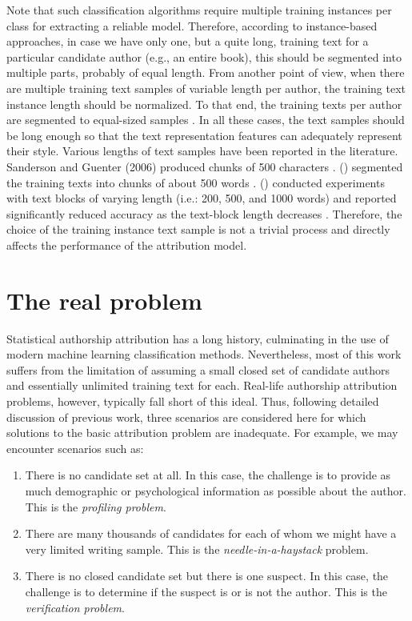 Note that such classification algorithms require multiple training instances per class for extracting a reliable model. Therefore, according to instance-based approaches, in case
we have only one, but a quite long, training text for a particular candidate author (e.g., an entire book), this should be segmented into multiple parts, probably of equal length.
From another point of view, when there are multiple training text samples of variable length per author, the training text instance length should be normalized. To that end, the training texts per author are segmented to equal-sized samples \cite{sanderson2006short}. In all these cases, the text samples should be long enough so that the text representation features can adequately represent their style. Various lengths of text samples have been reported in the literature. Sanderson and Guenter (2006) produced chunks of 500 characters \cite{sanderson2006short}. \citeauthor{koppel2006authorship} (\citeyear{koppel2006authorship}) segmented the training texts into
chunks of about 500 words \cite{koppel2006authorship}. \citeauthor{hirst2007bigrams} (\citeyear{hirst2007bigrams}) conducted experiments with text blocks of varying length (i.e.: 200, 500, and 1000 words) and reported significantly reduced accuracy as the text-block length decreases \cite{hirst2007bigrams}. Therefore, the choice of the training instance text sample is not a trivial process and directly affects the performance of the attribution model.


\section{The real problem}

Statistical authorship attribution has a long history, culminating in the use of modern machine learning classification methods. Nevertheless, most of this work suffers from the limitation of assuming a small closed set of candidate authors and essentially unlimited training text for each. Real-life authorship attribution problems, however, typically fall short of this ideal. Thus, following detailed discussion of previous work, three scenarios are considered here for which solutions to the basic attribution problem are inadequate.
For example, we may encounter scenarios such as:

\begin{enumerate}
	\item There is no candidate set at all. In this case, the challenge is to provide as much demographic or psychological information as possible about the author. This is the \textit{profiling problem}.
	\item There are many thousands of candidates for each of whom we might have a very limited writing sample. This is the \textit{needle-in-a-haystack} problem.
	\item There is no closed candidate set but there is one suspect. In this case, the challenge is to determine if the suspect is or is not the author. This is the \textit{verification problem}.
\end{enumerate}


